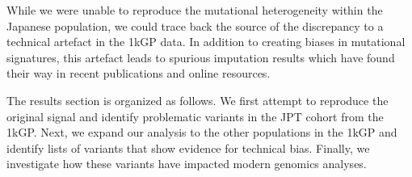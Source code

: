 \documentclass[9pt,lineno]{template}
\begin{document}
While we were unable to reproduce the mutational heterogeneity within the Japanese population, we could trace back the source of the discrepancy to a technical artefact in the 1kGP data.
In addition to creating biases in mutational signatures, this artefact leads to spurious imputation results which have found their way in recent publications and online resources.


The results section is organized as follows.
We first attempt to reproduce the original signal and identify problematic variants in the JPT cohort from the 1kGP. 
Next, we expand our analysis to the other populations in the 1kGP and identify lists of variants that show evidence for technical bias.
Finally, we investigate how these variants have impacted modern genomics analyses.
  

\begin{figure}

\end{figure}
\end{document}
